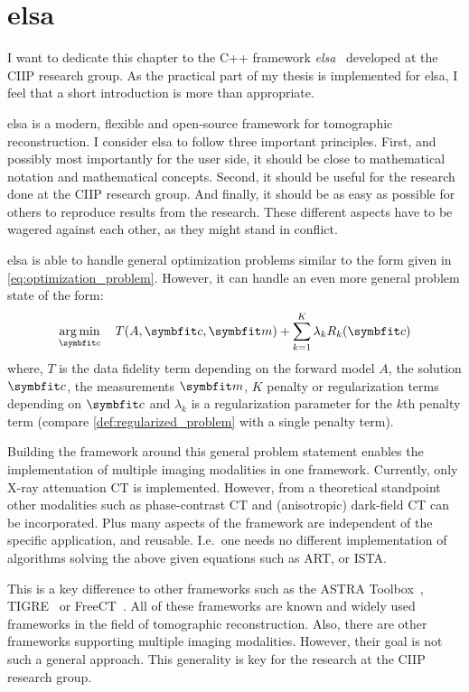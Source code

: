 \chapter{elsa}\label{chap:elsa}

I want to dedicate this chapter to the C++ framework \textit{elsa}~\cite{lasser_elsa_2019} developed
at the \gls{CIIP} research group. As the practical part of my thesis is implemented for elsa, I feel
that a short introduction is more than appropriate.

elsa is a modern, flexible and open-source framework for tomographic reconstruction. I consider elsa
to follow three important principles. First, and possibly most importantly for the user side, it
should be close to mathematical notation and mathematical concepts. Second, it should be useful for
the research done at the \gls{CIIP} research group. And finally, it should be as easy as possible
for others to reproduce results from the research. These different aspects have to be wagered
against each other, as they might stand in conflict.

elsa is able to handle general optimization problems similar to the form given in
\autoref{eq:optimization_problem}. However, it can handle an even more general problem state of the
form:
\begin{equation}\label{eq:complex_optimization_problem}
	\argmin_{\mvec{c}} \quad T(A, \mvec{c}, \mvec{m}) + \sum_{k=1}^K \lambda_k R_k(\mvec{c})
\end{equation}
where, \(T\) is the data fidelity term depending on the forward model \(A\), the solution
\(\mvec{c}\), the measurements \(\mvec{m}\), \(K\) penalty or regularization terms depending on
\(\mvec{c}\) and \(\lambda_k\) is a regularization parameter for the \(k\)th penalty term (compare
\autoref{def:regularized_problem} with a single penalty term).

Building the framework around this general problem statement enables the implementation of multiple
imaging modalities in one framework. Currently, only X-ray attenuation CT is implemented. However,
from a theoretical standpoint other modalities such as phase-contrast CT and (anisotropic) dark-field
CT can be incorporated. Plus many aspects of the framework are independent of the specific
application, and reusable. I.e.\ one needs no different implementation of algorithms solving the
above given equations such as \gls{ART}, or \gls{ISTA}\@.

This is a key difference to other frameworks such as the ASTRA Toolbox~\cite{van_aarle_fast_2016},
TIGRE~\cite{biguri_tigre_2016} or FreeCT~\cite{hoffman_technical_2016}. All of these frameworks are
known and widely used frameworks in the field of tomographic reconstruction. Also, there are other
frameworks supporting multiple imaging modalities. However, their goal is not such a general
approach. This generality is key for the research at the \gls{CIIP} research group.

